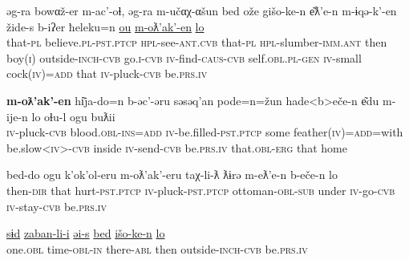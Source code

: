 \documentclass[output=paper]{LSP/langsci}
\begin{document}
\begin{exe}
\gll əg-ra bowαž-er m-ac’-oɬ, əg-ra m-učαχ-αšun bed ože gišo-ke-n e͂ƛ’e-n m-ɨqə-k’-en žide-s b-iʔer ħeleku=n \underline{ou} \underline{m-oƛ'ak’-en} \underline{lo} \\
that-\textsc{pl} believe.\textsc{pl-pst.ptcp} \textsc{hpl}-see-\textsc{ant.cvb} that-\textsc{pl} \textsc{hpl}-slumber-\textsc{imm.ant} then boy(\textsc{i}) outside-\textsc{inch-cvb} go.\textsc{i}-\textsc{cvb} \textsc{iv}-find-\textsc{caus-cvb} self.\textsc{obl.pl-gen} \textsc{iv}-small cock(\textsc{iv})=\textsc{add} that \textsc{iv}-pluck-\textsc{cvb} be.\textsc{prs.iv}\\
\glt {}
\end{exe}

\begin{exe} 
\gll \textbf{m-oƛ'ak’-en} hi͂ja-do=n b-əc’-əru səsəq’an pode=n=žun hade<b>eče-n e͂du m-ije-n lo oɬu-l ogu buƛii \\
\textsc{iv}-pluck-\textsc{cvb} blood.\textsc{obl-ins=add} \textsc{iv}-be.filled-\textsc{pst.ptcp} some feather(\textsc{iv)=add}=with be.slow<\textsc{iv}>-\textsc{cvb} inside \textsc{iv}-send-\textsc{cvb} be.\textsc{prs.iv}  that.\textsc{obl-erg} that home\\
\glt {}
\end{exe}

\begin{exe}
\gll bed-do ogu k’ok’ol-eru m-oƛ’ak’-eru taχ-li-ƛ ƛɨrə m-eƛ’e-n b-eče-n lo\\
then-\textsc{dir} that hurt-\textsc{pst.ptcp} \textsc{iv}-pluck-\textsc{pst.ptcp} ottoman-\textsc{obl-sub} under \textsc{iv}-go-\textsc{cvb} \textsc{iv}-stay-\textsc{cvb} be.\textsc{prs.iv}\\
\glt {}
\end{exe}

\begin{exe}
\gll \underline{sɨd} \underline{zaban-li-i} \underline{əi-s} \underline{bed} \underline{išo-ke-n} \underline{lo}\\
one.\textsc{obl} time-\textsc{obl-in} there-\textsc{abl} then outside-\textsc{inch-cvb} be.\textsc{prs.iv}\\
\glt {}
\end{exe}
\end{document}

